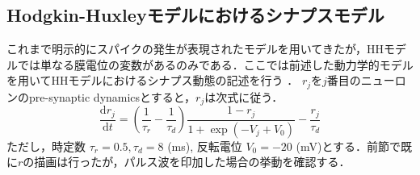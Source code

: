 \subsection{Hodgkin-Huxleyモデルにおけるシナプスモデル}
これまで明示的にスパイクの発生が表現されたモデルを用いてきたが，HHモデルでは単なる膜電位の変数があるのみである．ここでは前述した動力学的モデルを用いてHHモデルにおけるシナプス動態の記述を行う \citep{Destexhe1994-ro,Batista2014-ax}．
$r_{j}$を$j$番目のニューロンのpre-synaptic dynamicsとすると，$r_{j}$は次式に従う．
\begin{equation}
\frac{\mathrm{d} r_{j}}{\mathrm{d} t}=\left(\frac{1}{\tau_{r}}-\frac{1}{\tau_{d}}\right) \frac{1-r_{j}}{1+\exp \left(-V_{j}+V_{0}\right)}-\frac{r_{j}}{\tau_{d}}
\end{equation}
ただし，時定数 $\tau_r=0.5, \tau_d = 8$ (ms), 反転電位 $V_0 = -20$ (mV)とする．前節で既に$r$の描画は行ったが，パルス波を印加した場合の挙動を確認する．
